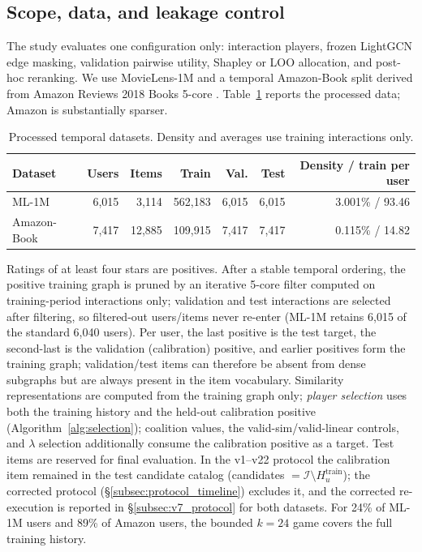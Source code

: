 \documentclass[pdflatex,sn-mathphys-num]{sn-jnl}
\begin{document}
\subsection{Scope, data, and leakage control}\label{subsec:leakage}\label{subsec:case_scope}\label{subsec:data_splits}

The study evaluates one configuration only: interaction players, frozen LightGCN edge masking, validation pairwise utility, Shapley or LOO allocation, and post-hoc reranking. We use MovieLens-1M \cite{harper2015movielens} and a temporal Amazon-Book split derived from Amazon Reviews 2018 Books 5-core \cite{ni2019justifying}. Table~\ref{tab:datasets} reports the processed data; Amazon is substantially sparser.

\begin{table}[t]
\caption{Processed temporal datasets. Density and averages use training interactions only.}\label{tab:datasets}
\centering
\small
\begin{tabular}{lrrrrrr}
\toprule
Dataset & Users & Items & Train & Val. & Test & Density / train per user \\
\midrule
ML-1M & 6{,}015 & 3{,}114 & 562{,}183 & 6{,}015 & 6{,}015 & 3.001\% / 93.46 \\
Amazon-Book & 7{,}417 & 12{,}885 & 109{,}915 & 7{,}417 & 7{,}417 & 0.115\% / 14.82 \\
\bottomrule
\end{tabular}
\end{table}

Ratings of at least four stars are positives. After a stable temporal ordering, the positive training graph is pruned by an iterative 5-core filter computed on training-period interactions only; validation and test interactions are selected after filtering, so filtered-out users/items never re-enter (ML-1M retains 6{,}015 of the standard 6{,}040 users). Per user, the last positive is the test target, the second-last is the validation (calibration) positive, and earlier positives form the training graph; validation/test items can therefore be absent from dense subgraphs but are always present in the item vocabulary. Similarity representations are computed from the training graph only; \emph{player selection} uses both the training history and the held-out calibration positive (Algorithm~\ref{alg:selection}); coalition values, the valid-sim/valid-linear controls, and $\lambda$ selection additionally consume the calibration positive as a target. Test items are reserved for final evaluation. In the v1--v22 protocol the calibration item remained in the test candidate catalog (candidates $=\mathcal{I}\setminus H_u^{\mathrm{train}}$); the corrected protocol (\S\ref{subsec:protocol_timeline}) excludes it, and the corrected re-execution is reported in \S\ref{subsec:v7_protocol} for both datasets. For 24\% of ML-1M users and 89\% of Amazon users, the bounded $k=24$ game covers the full training history.
\end{document}
